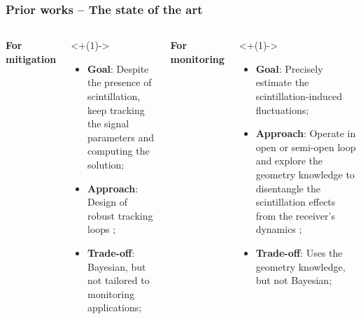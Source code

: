 \documentclass[
    hyperref={colorlinks,citecolor=DeepPink4,linkcolor=DarkRed,urlcolor=DarkBlue}
]{beamer_class}
\begin{document}
\begin{frame}[t] %
	\frametitle{Prior works -- The state of the art}

    \begin{columns}
        \textbf{For mitigation}
        \begin{visibleenv}<+(1)->
            \begin{itemize}
                \item \textbf{Goal}: Despite the presence of scintillation, keep tracking the signal parameters and computing the  solution;
                \item \textbf{Approach}: Design of robust tracking loops \cite{barreauKalmanFilterBased2012, psiakiExtendedKalmanFilter2002,florindoMultiFrequencyKalmanFilter2024,fohlmeisterDualKalmanFiltering2018};
                \item \textbf{Trade-off}: Bayesian, but not tailored to monitoring applications;
            \end{itemize}
        \end{visibleenv}
        
        \textbf{For monitoring}
        \begin{visibleenv}<+(1)->
            \begin{itemize}
                \item \textbf{Goal}: Precisely estimate the scintillation-induced fluctuations;
                \item \textbf{Approach}: Operate in open or semi-open loop and explore the geometry knowledge to disentangle the scintillation effects from the receiver's dynamics \cite{xuSemiOpenLoopGNSS2018,lintyOpenLoopReceiverArchitecture2019,gnssDevelopingIonosphericScintillation2014,jiaoEquatorialScintillationAmplitude2016};
                \item \textbf{Trade-off}: Uses the geometry knowledge, but not Bayesian;
            \end{itemize}
        \end{visibleenv}
	\end{columns}
	
\end{frame}
\end{document}
